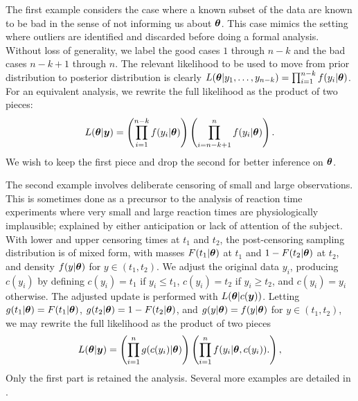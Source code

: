\documentclass[ba]{imsart}
\def\bth{\mbox{\boldmath $\theta$}}
\newcommand{\by}{\mbox{\boldmath $y$}}
\begin{document}
The first example considers the case where a known subset of the data are known to be 
bad in the sense of not informing us about $\bth$.  This case mimics the setting where outliers are identified and discarded before doing a formal analysis.  Without loss of generality, we label the good cases $1$ through $n-k$ and the bad cases $n-k+1$ through $n$.  The relevant likelihood to be used to move from prior distribution to posterior distribution is clearly $L(\bth | y_1, \ldots, y_{n-k}) = \prod_{i=1}^{n-k} f(y_i | \bth)$.  For an equivalent analysis, we rewrite the full likelihood as the product of two pieces:
\begin{eqnarray}
\label{OutlyingCases}
L(\bth | \by)  
= \left( \prod_{i=1}^{n-k} f(y_i | \bth) \right) \left( \prod_{i=n-k+1}^{n} f(y_i | \bth) \right) .  
\end{eqnarray}
We wish to keep the first piece and drop the second for better inference on $\bth$.

The second example involves deliberate censoring of small and large observations. This is
sometimes done as a precursor to the analysis of reaction time experiments  \citep[e.g.,][]{ratcliff1993} where very small and large reaction times are physiologically implausible;  explained by either anticipation or lack of attention of the subject.  
With lower and upper censoring times at $t_1$ and $t_2$, the post-censoring sampling distribution is of mixed form, with masses $F(t_1|\bth)$ at $t_1$ and $1-F(t_2|\bth)$ at $t_2$,
and density $f(y | \bth)$ for $y \in (t_1, t_2)$.  We adjust the original data $y_i$,
producing $c(y_i)$ by defining $c(y_i)= t_1$ if $y_i \leq t_1$, $c(y_i)=t_2$ 
if $y_i \geq t_2$, and $c(y_i)=y_i$ otherwise.  
The adjusted update is performed with $L(\bth |c(\by))$.  
Letting $g(t_1|\bth) = F(t_1|\bth)$,
$g(t_2 | \bth) = 1 - F(t_2|\bth)$, and $g(y|\bth)=f(y|\bth)$ for
$y \in (t_1, t_2)$, we may rewrite the full 
likelihood as the product of two pieces
\begin{eqnarray}
\label{Censoring} 
L(\bth | \by) =  \left( \prod_{i=1}^n g(c(y_i)  | \bth) \right) \left( \prod_{i=1}^n f(y_i|\bth,c(y_i)). \right) ,  
\end{eqnarray}
Only the first part is retained the analysis. Several more examples are detailed in \cite{lewis2014}.



\end{document}

